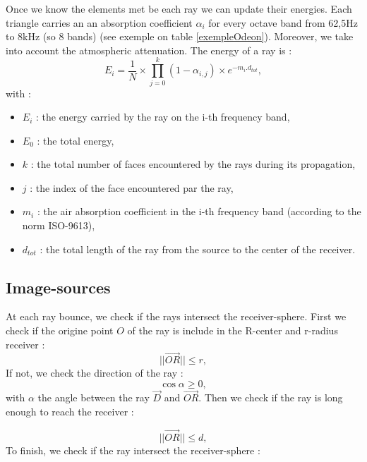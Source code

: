 \documentclass[AMA,STIX1COL]{WileyNJD-v2}
\begin{document}

Once we know the elements met be each ray we can update their energies. Each triangle carries an an absorption coefficient $\alpha_i$ for every octave band from 62,5Hz to 8kHz (so 8 bands) (see exemple on table \ref{exempleOdeon}). Moreover, we take into account the atmospheric attenuation. The energy of a ray is :
\begin{equation}
E_{i} =  \frac{1}{N} \times \prod_{j=0}^{k}{(1-\alpha_{i,j})} \times e^{-m_i . d_{tot}},
\end{equation}
with : 
\begin{itemize}
\item $E_{i}$ : the energy carried by the ray on the i-th frequency band,
\item $E_{0}$ : the total energy,
\item $k$ : the total number of faces encountered by the rays during its propagation,
\item $j$ : the index of the face encountered par the ray,
\item $m_i$ : the air absorption coefficient in the i-th frequency band (according to the norm ISO-9613),
\item $ d_{tot}$ : the total length of the ray from the source to the center of the receiver.
\end{itemize}


\subsection{Image-sources}

At each ray bounce, we check if the rays intersect the receiver-sphere. First we check if the origine point $O$ of the ray is include in the R-center and r-radius receiver :
\begin{equation}
||\overrightarrow{OR}|| \leqslant r,
\end{equation}
%
If not, we check the direction of the ray :
\begin{equation}
\cos{\alpha} \geqslant 0,
\end{equation}
with $\alpha$ the angle between the ray $\overrightarrow{D}$ and $\overrightarrow{OR}$. Then we check if the ray is long enough to reach the receiver :

\begin{equation}
||\overrightarrow{OR}|| \leqslant d,
\end{equation}
%
To finish, we check if the ray intersect the receiver-sphere :
\end{document}
